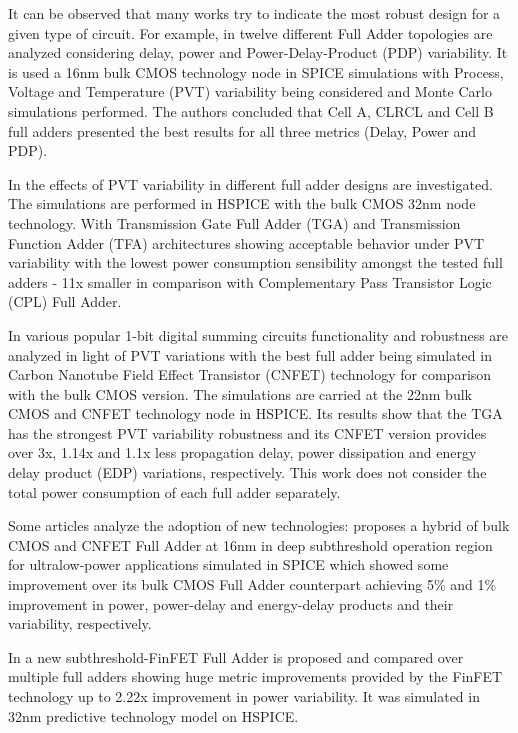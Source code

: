 \documentclass[ecp,tc, english]{iiufrgs}
\begin{document}
It can be observed that many works try to indicate the most robust design for a given type of circuit. For example, in \cite{dokania2013investigation} twelve different Full Adder topologies are analyzed considering delay, power and Power-Delay-Product (PDP) variability. It is used a 16nm bulk CMOS technology node in SPICE simulations with Process, Voltage and Temperature (PVT) variability being considered and Monte Carlo simulations performed. The authors concluded that Cell A, CLRCL and Cell B full adders presented the best results for all three metrics (Delay, Power and PDP).

In \cite{ames2016investigating} the effects of PVT variability in different full adder designs are investigated. The simulations are performed in HSPICE with the bulk CMOS 32nm node technology. With Transmission Gate Full Adder (TGA) and Transmission Function Adder (TFA) architectures showing acceptable behavior under PVT variability with the lowest power consumption sensibility amongst the tested full adders - 11x smaller in comparison with Complementary Pass Transistor Logic (CPL) Full Adder.

In \cite{islam2011design} various popular 1-bit digital summing circuits functionality and robustness are analyzed in light of PVT variations with the best full adder being simulated in Carbon Nanotube Field Effect Transistor (CNFET) technology for comparison with the bulk CMOS version. The simulations are carried at the 22nm bulk CMOS and CNFET technology node in HSPICE. Its results show that the TGA has the strongest PVT variability robustness and its CNFET version provides over 3x, 1.14x and 1.1x less propagation delay, power dissipation and energy delay product (EDP) variations, respectively. This work does not consider the total power consumption of each full adder separately.

Some articles analyze the adoption of new technologies: \cite{guduri2015design} proposes a hybrid of bulk CMOS and CNFET Full Adder at 16nm in deep subthreshold operation region for ultralow-power applications simulated in SPICE which showed some improvement over its bulk CMOS Full Adder counterpart achieving 5\% and 1\% improvement in power, power-delay and energy-delay products and their variability, respectively.  

In \cite{islam2011variability} a new subthreshold-FinFET Full Adder is proposed and compared over multiple full adders showing huge metric improvements provided by the FinFET technology up to 2.22x improvement in power variability. It was simulated in 32nm predictive technology model on HSPICE. 
\end{document}
